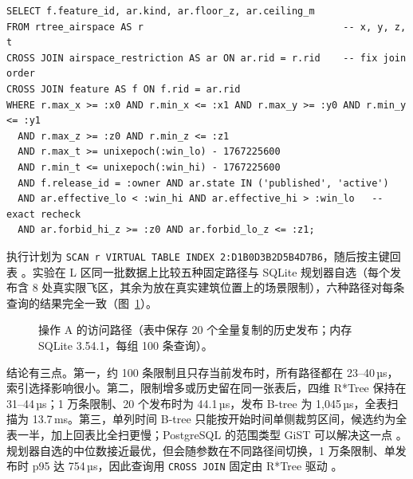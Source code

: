 \documentclass[a4paper,11pt,UTF8]{ctexart}
\begin{document}
\begin{verbatim}
SELECT f.feature_id, ar.kind, ar.floor_z, ar.ceiling_m
FROM rtree_airspace AS r                                   -- x, y, z, t
CROSS JOIN airspace_restriction AS ar ON ar.rid = r.rid    -- fix join order
CROSS JOIN feature AS f ON f.rid = ar.rid
WHERE r.max_x >= :x0 AND r.min_x <= :x1 AND r.max_y >= :y0 AND r.min_y <= :y1
  AND r.max_z >= :z0 AND r.min_z <= :z1
  AND r.max_t >= unixepoch(:win_lo) - 1767225600
  AND r.min_t <= unixepoch(:win_hi) - 1767225600
  AND f.release_id = :owner AND ar.state IN ('published', 'active')
  AND ar.effective_lo < :win_hi AND ar.effective_hi > :win_lo   -- exact recheck
  AND ar.forbid_hi_z >= :z0 AND ar.forbid_lo_z <= :z1;
\end{verbatim}

执行计划为 \texttt{SCAN r VIRTUAL TABLE INDEX 2:D1B0D3B2D5B4D7B6}，随后按主键回表 \cite{sqlite-eqp}。实验在 L 区同一批数据上比较五种固定路径与 SQLite 规划器自选（每个发布含 8 处真实限飞区，其余为放在真实建筑位置上的场景限制），六种路径对每条查询的结果完全一致（图~\ref{fig:opa}）。

\begin{figure}[htbp]\centering
{}
\caption{操作 A 的访问路径（表中保存 20 个全量复制的历史发布；内存 SQLite 3.54.1，每组 100 条查询）。}\label{fig:opa}
\end{figure}

结论有三点。第一，约 100 条限制且只存当前发布时，所有路径都在 23–40\,µs，索引选择影响很小。第二，限制增多或历史留在同一张表后，四维 R*Tree 保持在 31–44\,µs；1 万条限制、20 个发布时为 44.1\,µs，发布 B-tree 为 1,045\,µs，全表扫描为 13.7\,ms。第三，单列时间 B-tree 只能按开始时间单侧裁剪区间，候选约为全表一半，加上回表比全扫更慢；PostgreSQL 的范围类型 GiST 可以解决这一点 \cite{pg-gist,pg-range}。规划器自选的中位数接近最优，但会随参数在不同路径间切换，1 万条限制、单发布时 p95 达 754\,µs，因此查询用 \texttt{CROSS JOIN} 固定由 R*Tree 驱动 \cite{sqlite-opt}。
\end{document}
